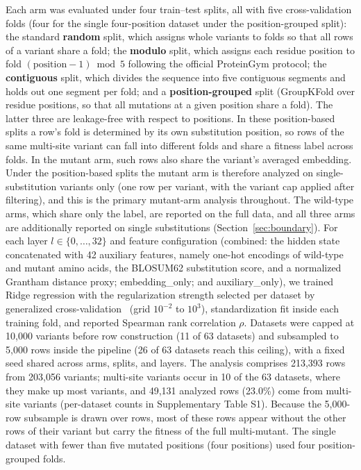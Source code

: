 \documentclass[11pt,a4paper]{article}
\newcommand{\revised}[1]{#1}
\newcommand{\rtwo}[1]{#1}
\newcommand{\rthree}[1]{#1}
\begin{document}
\revised{Each arm was evaluated under four train--test splits, all with five
cross-validation folds (four for the single four-position dataset under the
position-grouped split): the standard \textbf{random} split\rtwo{, which assigns whole
variants to folds so that all rows of a variant share a fold}; the \textbf{modulo}
split, which assigns each residue position to fold $(\text{position} - 1) \bmod 5$
following the official ProteinGym protocol; the \textbf{contiguous} split, which
divides the sequence into five contiguous segments and holds out one segment per
fold; and a \textbf{position-grouped} split (GroupKFold over residue positions, so
that all mutations at a given position share a fold). The latter three are
leakage-free with respect to positions. \rtwo{In these position-based splits a row's
fold is determined by its own substitution position, so rows of the same multi-site
variant can fall into different folds and share a fitness label across folds\rthree{.
In the mutant arm, such rows also share the variant's averaged embedding. Under the
position-based splits the mutant arm is therefore analyzed on single-substitution
variants only (one row per variant, with the variant cap applied after filtering),
and this is the primary mutant-arm analysis throughout. The wild-type arms, which share
only the label, are reported on the full data, and all three arms are additionally
reported on single substitutions (Section~\ref{sec:boundary}).}} For each layer $l \in \{0,\dots,32\}$ and
feature configuration (combined: the hidden state concatenated with 42 auxiliary
features, namely one-hot encodings of wild-type and mutant amino acids, the BLOSUM62
substitution score, and a normalized Grantham distance proxy; embedding\_only; and
auxiliary\_only), we trained Ridge regression with the regularization strength
selected per dataset by generalized cross-validation~\cite{golub1979generalized}
(grid $10^{-2}$ to $10^{3}$), standardization fit inside each training fold, and
reported Spearman rank correlation $\rho$. \rtwo{Datasets were capped at 10,000
variants before row construction (11 of 63 datasets) and subsampled to 5,000 rows
inside the pipeline (26 of 63 datasets reach this ceiling)}, with a fixed seed shared
across arms, splits, and layers. \rtwo{The analysis comprises 213,393 rows from 203,056
variants; multi-site variants occur in 10 of the 63 datasets\rthree{, where they make
up most variants, and 49,131 analyzed rows (23.0\%) come from multi-site variants
(per-dataset counts in Supplementary Table S1). Because the 5,000-row subsample is
drawn over rows, most of these rows appear without the other rows of their variant
but carry the fitness of the full multi-mutant.}} The single
dataset with fewer than five mutated positions (four positions) used four
position-grouped folds.}
\end{document}
